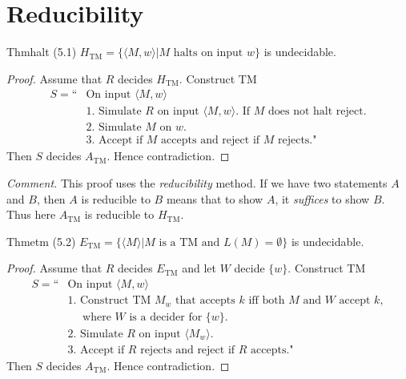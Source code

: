 \chapter{Reducibility}

\begin{reference}{Thm}{halt}
  (5.1) $H_{\mathrm{TM}}=\{\langle M,w\rangle|M\text{ halts on input }w\}$ is undecidable.
\end{reference}

\begin{proof}
  Assume that $R$ decides $H_{\mathrm{TM}}$. Construct TM
  \begin{align*}
    S=\text{``} & \text{On input }\langle M,w\rangle                                                                \\
                & \text{1. Simulate }R\text{ on input }\langle M,w\rangle.\text{ If }M\text{ does not halt reject}. \\
                & \text{2. Simulate }M\text{ on }w.                                                                 \\
                & \text{3. Accept if }M\text{ accepts and reject if }M\text{ rejects."}
  \end{align*}
  Then $S$ decides $A_{\mathrm{TM}}$. Hence contradiction.
\end{proof}

\textit{Comment.} This proof uses the \textit{reducibility} method. If we have two statements $A$ and $B$, then $A$ is reducible to $B$ means that to show $A$, it \textit{suffices} to show $B$. Thus here $A_{\mathrm{TM}}$ is reducible to $H_{\mathrm{TM}}$.


\begin{reference}{Thm}{etm}
  (5.2) $E_{\mathrm{TM}}=\{\langle M\rangle|M\text{ is a TM and }L(M)=\emptyset\}$ is undecidable.
\end{reference}

\begin{proof}
  Assume that $R$ decides $E_{\mathrm{TM}}$ and let $W$ decide $\{w\}$. Construct TM
  \begin{align*}
    S=\text{``} & \text{On input }\langle M,w\rangle                                                               \\
                & \text{1. Construct TM }M_w\text{ that accepts }k\text{ iff both }M\text{ and }W\text{ accept }k, \\
                & \quad\text{ where }W\text{ is a decider for }\{w\}.                                              \\
                & \text{2. Simulate }R\text{ on input }\langle M_w\rangle.                                         \\
                & \text{3. Accept if }R\text{ rejects and reject if }R\text{ accepts."}
  \end{align*}
  Then $S$ decides $A_{\mathrm{TM}}$. Hence contradiction.
\end{proof}

